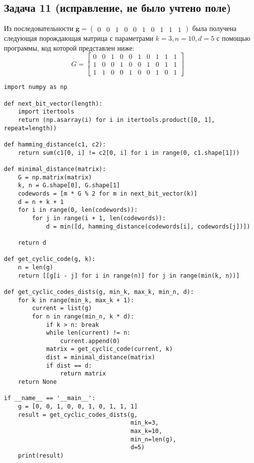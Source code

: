 \documentclass{article}
\begin{document}
\subsection{Задача 11 (исправление, не было учтено поле)}
%
Из последовательности $\boldsymbol{g} = \begin{pmatrix}0 & 0 & 1 & 0 & 0 & 1 & 0 & 1 & 1 & 1\end{pmatrix}$ была получена следующая порождающая матрица с параметрами $k=3, n = 10, d = 5$ с помощью программы, код которой представлен ниже:
$$G = 
\begin{bmatrix}
   0 & 0 & 1 & 0 & 0 & 1 & 0 & 1 & 1 & 1 \\
   1 & 0 & 0 & 1 & 0 & 0 & 1 & 0 & 1 & 1 \\
   1 & 1 & 0 & 0 & 1 & 0 & 0 & 1 & 0 & 1
\end{bmatrix}$$
%
\begin{lstlisting}[frame=single]
import numpy as np

def next_bit_vector(length):
    import itertools
    return (np.asarray(i) for i in itertools.product([0, 1], repeat=length))

def hamming_distance(c1, c2):
    return sum(c1[0, i] != c2[0, i] for i in range(0, c1.shape[1]))

def minimal_distance(matrix):
    G = np.matrix(matrix)
    k, n = G.shape[0], G.shape[1]
    codewords = [m * G % 2 for m in next_bit_vector(k)]
    d = n + k + 1
    for i in range(0, len(codewords)):
        for j in range(i + 1, len(codewords)):
            d = min([d, hamming_distance(codewords[i], codewords[j])])

    return d

def get_cyclic_code(g, k):
    n = len(g)
    return [[g[i - j] for i in range(n)] for j in range(min(k, n))]
    
def get_cyclic_codes_dists(g, min_k, max_k, min_n, d):
    for k in range(min_k, max_k + 1):
        current = list(g)
        for n in range(min_n, k * d):
            if k > n: break
            while len(current) != n:
                current.append(0)
            matrix = get_cyclic_code(current, k)
            dist = minimal_distance(matrix)
            if dist == d:
                return matrix
    return None

if __name__ == '__main__':
    g = [0, 0, 1, 0, 0, 1, 0, 1, 1, 1]
    result = get_cyclic_codes_dists(g, 
                                    min_k=3, 
                                    max_k=10, 
                                    min_n=len(g), 
                                    d=5)
    print(result)
\end{lstlisting}
%
\end{document}
